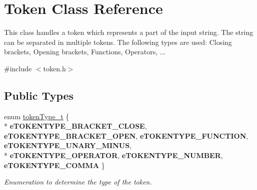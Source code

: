 \hypertarget{class_token}{}\section{Token Class Reference}
\label{class_token}


This class handles a token which represents a part of the input string. The string can be separated in multiple tokens. The following types are used\+: Closing brackets, Opening brackets, Functions, Operators, ...  




{\ttfamily \#include $<$token.\+h$>$}

\subsection*{Public Types}
\begin{DoxyCompactItemize}
\item 
\hypertarget{class_token_af5797fcd4cb63823f3108625cbb83d11}{}enum \hyperlink{class_token_af5797fcd4cb63823f3108625cbb83d11}{token\+Type\+\_\+t} \{ \\*
{\bfseries e\+T\+O\+K\+E\+N\+T\+Y\+P\+E\+\_\+\+B\+R\+A\+C\+K\+E\+T\+\_\+\+C\+L\+O\+S\+E}, 
{\bfseries e\+T\+O\+K\+E\+N\+T\+Y\+P\+E\+\_\+\+B\+R\+A\+C\+K\+E\+T\+\_\+\+O\+P\+E\+N}, 
{\bfseries e\+T\+O\+K\+E\+N\+T\+Y\+P\+E\+\_\+\+F\+U\+N\+C\+T\+I\+O\+N}, 
{\bfseries e\+T\+O\+K\+E\+N\+T\+Y\+P\+E\+\_\+\+U\+N\+A\+R\+Y\+\_\+\+M\+I\+N\+U\+S}, 
\\*
{\bfseries e\+T\+O\+K\+E\+N\+T\+Y\+P\+E\+\_\+\+O\+P\+E\+R\+A\+T\+O\+R}, 
{\bfseries e\+T\+O\+K\+E\+N\+T\+Y\+P\+E\+\_\+\+N\+U\+M\+B\+E\+R}, 
{\bfseries e\+T\+O\+K\+E\+N\+T\+Y\+P\+E\+\_\+\+C\+O\+M\+M\+A}
 \}\label{class_token_af5797fcd4cb63823f3108625cbb83d11}

\begin{DoxyCompactList}\small\item\em Enumeration to determine the type of the token. \end{DoxyCompactList}\end{DoxyCompactItemize}
